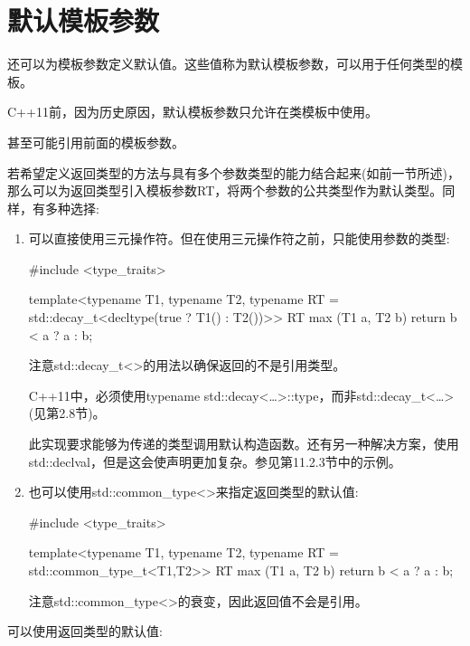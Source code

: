 \section{默认模板参数}

还可以为模板参数定义默认值。这些值称为默认模板参数，可以用于任何类型的模板。

\begin{notice}
C++11前，因为历史原因，默认模板参数只允许在类模板中使用。
\end{notice}

甚至可能引用前面的模板参数。

若希望定义返回类型的方法与具有多个参数类型的能力结合起来(如前一节所述)，那么可以为返回类型引入模板参数RT，将两个参数的公共类型作为默认类型。同样，有多种选择:

\begin{enumerate}
\item 
可以直接使用三元操作符。但在使用三元操作符之前，只能使用参数的类型:

\begin{cpp}
#include <type_traits>

template<typename T1, typename T2,
typename RT = std::decay_t<decltype(true ? T1() : T2())>>
RT max (T1 a, T2 b)
{
	return b < a ? a : b;
}
\end{cpp}

注意std::decay\_t<>的用法以确保返回的不是引用类型。

\begin{notice}
C++11中，必须使用typename std::decay<…>::type，而非std::decay\_t<…>(见第2.8节)。
\end{notice}

此实现要求能够为传递的类型调用默认构造函数。还有另一种解决方案，使用std::declval，但是这会使声明更加复杂。参见第11.2.3节中的示例。

\item
也可以使用std::common\_type<>来指定返回类型的默认值:

\begin{cpp}
#include <type_traits>

template<typename T1, typename T2,
typename RT = std::common_type_t<T1,T2>>
RT max (T1 a, T2 b)
{
	return b < a ? a : b;
}
\end{cpp}

注意std::common\_type<>的衰变，因此返回值不会是引用。
\end{enumerate}

可以使用返回类型的默认值:

